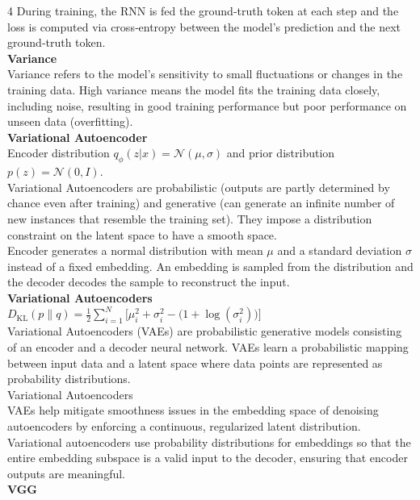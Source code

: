 \documentclass[8pt]{extarticle}
\begin{document}
\begin{multicols}{4}
During training, the RNN is fed the ground‑truth token at each step and the loss is computed via cross‑entropy between the model's prediction and the next ground‑truth token.\\
\vspace{2pt}\textbf{Variance}\\
Variance refers to the model’s sensitivity to small fluctuations or changes in the training data. High variance means the model fits the training data closely, including noise, resulting in good training performance but poor performance on unseen data (overfitting).\\
\vspace{2pt}\textbf{Variational Autoencoder}\\
Encoder distribution $q_{\phi}(z|x) = \mathcal{N}(\mu, \sigma)$ and prior distribution $p(z) = \mathcal{N}(0, I)$.\\
Variational Autoencoders are probabilistic (outputs are partly determined by chance even after training) and generative (can generate an infinite number of new instances that resemble the training set). They impose a distribution constraint on the latent space to have a smooth space.\\
Encoder generates a normal distribution with mean $\mu$ and a standard deviation $\sigma$ instead of a fixed embedding. An embedding is sampled from the distribution and the decoder decodes the sample to reconstruct the input.\\
\vspace{2pt}\textbf{Variational Autoencoders}\\
$D_{\mathrm{KL}}(p\|q) = \frac12 \sum_{i=1}^{N} \big[\mu_i^{2} + \sigma_i^{2} - \big(1 + \log(\sigma_i^{2})\big)\big]$\\
Variational Autoencoders (VAEs) are probabilistic generative models consisting of an encoder and a decoder neural network. VAEs learn a probabilistic mapping between input data and a latent space where data points are represented as probability distributions.\\
Variational Autoencoders\\
VAEs help mitigate smoothness issues in the embedding space of denoising autoencoders by enforcing a continuous, regularized latent distribution.\\
Variational autoencoders use probability distributions for embeddings so that the entire embedding subspace is a valid input to the decoder, ensuring that encoder outputs are meaningful.\\
\vspace{2pt}\textbf{VGG}\\

\end{multicols}
\end{document}
